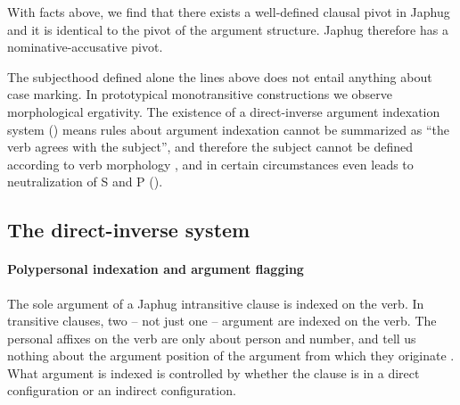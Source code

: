 \documentclass[a4paper, oneside, 12pt]{report}
\newcommand*{\citepage}[1]{p.~{#1}}
\begin{document}
With facts above, we find that there exists a well-defined clausal pivot in Japhug
and it is identical to the pivot of the argument structure.
Japhug therefore has a nominative-accusative pivot.

The subjecthood defined alone the lines above does not entail
anything about case marking.
In prototypical monotransitive constructions
we observe morphological ergativity.
The existence of a direct-inverse argument indexation system ()
means rules about argument indexation cannot be summarized as 
``the verb agrees with the subject'',
and therefore the subject cannot be defined according to verb morphology \citep{jacques2016subjects},
and in certain circumstances even leads to neutralization of S and P
().

\subsection{The direct-inverse system}\label{sec:grammatical.clause.direct-inverse}

\paragraph*{Polypersonal indexation and argument flagging}
The sole argument of a Japhug intransitive clause is indexed on the verb.
In transitive clauses, 
two -- not just one -- argument are indexed on the verb. 
The personal affixes on the verb are only about person and number, 
and tell us nothing about the argument position of the argument 
from which they originate \citep[\citepage{543}]{jacques2021grammar}.
What argument is indexed is controlled by whether the clause is in a direct configuration
or an indirect configuration.
\end{document}
